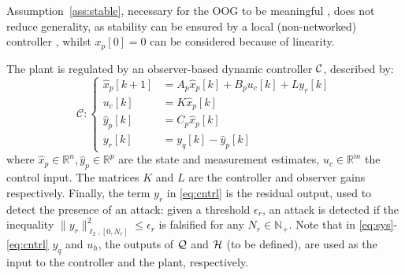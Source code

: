Assumption~\ref{ass:stable}, necessary for the OOG to be meaningful \citep{teixeira2015secure}, does not reduce generality, as stability can be ensured by a local (non-networked) controller \citep{hu2007stability,lin2023secondary}, whilst $x_p[0] = 0$ can be considered because of linearity.


The plant is regulated by an observer-based dynamic controller $\mathcal{C}$, described by:
\begin{equation}\label{eq:cntrl}
    \mathcal C: \left\{
	\begin{aligned}
		\hat{x}_p[k+1] &= A_p \hat{x}_p[k] + B_p u_c[k] + Ly_r[k]\\
		u_c[k] &= K\hat{x}_p[k]\\
		\hat{y}_p[k] &= C_p \hat{x}_p[k]\\
		y_r[k] &= y_q[k] - \hat{y}_p[k]
	\end{aligned}\right.
\end{equation}
where $\hat{x}_p \in \mathbb{R}^n, \hat{y}_p \in \mathbb{R}^p$ are the state and measurement estimates, $u_c \in \mathbb{R}^m$ the control input. The matrices $K$ and $L$ are the controller and observer gains respectively. Finally, the term $y_r$ in \eqref{eq:cntrl} is the residual output, used to detect the presence of an attack: given a threshold $\epsilon_r$, an attack is detected if the inequality $\|y_r\|_{\ell_2,[0,N_r]}^2 \leq \epsilon_r$ is falsified for any $N_r \in \mathbb{N}_+$. Note that in \eqref{eq:sys}-\eqref{eq:cntrl} $y_q$ and $u_h$, the outputs of $\mathcal{Q}$ and $\mathcal{H}$ (to be defined), are used as the input to the controller and the plant, respectively. 


